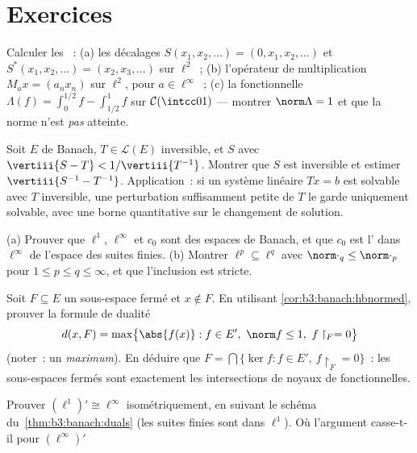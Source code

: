 \section{Exercices}

\begin{exercise}[$\star$]\label{exo:b3:banach:1}
Calculer les ~:
(a) les décalages $S(x_1, x_2, \dots) = (0, x_1, x_2, \dots)$
et $S^*(x_1, x_2, \dots) = (x_2, x_3, \dots)$ sur $\ell^2$~;
(b) l'opérateur de multiplication $M_a x = (a_nx_n)$ sur
$\ell^2$, pour $a \in \ell^\infty$~;
(c) la fonctionnelle $\Lambda(f) = \int_0^{1/2}f -
\int_{1/2}^1f$ sur $\mathcal C(\intcc01)$ --- montrer
$\norm\Lambda = 1$ et que la norme n'est \emph{pas} atteinte.
\end{exercise}

\begin{exercise}[$\star$]\label{exo:b3:banach:2}
Soit $E$ de Banach, $T \in \mathcal L(E)$ inversible, et $S$
avec $\vertiii{S - T} < 1/\vertiii{T^{-1}}$. Montrer que $S$
est inversible et estimer $\vertiii{S^{-1} - T^{-1}}$.
Application~: si un système linéaire $Tx = b$ est solvable
avec $T$ inversible, une perturbation suffisamment petite de
$T$ le garde uniquement solvable, avec une borne quantitative
sur le changement de solution.
\end{exercise}

\begin{exercise}[$\star\star$]\label{exo:b3:banach:3}
(a) Prouver que $\ell^1$, $\ell^\infty$ et $c_0$ sont des
espaces de Banach, et que $c_0$ est l' dans
$\ell^\infty$ de l'espace des suites finies.
(b) Montrer $\ell^p \subseteq \ell^q$ avec $\norm\cdot_q \leq
\norm\cdot_p$ pour $1 \leq p \leq q \leq \infty$, et que
l'inclusion est stricte.
\end{exercise}

\begin{exercise}[$\star\star$]\label{exo:b3:banach:4}
Soit $F \subseteq E$ un sous-espace fermé et $x \notin F$. En
utilisant \cref{cor:b3:banach:hbnormed}, prouver la formule de
dualité
\[
d(x, F) = \max\bigl\{\abs{f(x)} : f \in E',\ \norm f \leq 1,\
f\restriction_F = 0\bigr\}
\]
(noter~: un \emph{maximum}). En déduire que $F =
\bigcap\{\ker f : f \in E',\ f\restriction_F = 0\}$~: les
sous-espaces fermés sont exactement les intersections de
noyaux de fonctionnelles.
\end{exercise}

\begin{exercise}[$\star\star$]\label{exo:b3:banach:5}
Prouver $(\ell^1)' \cong \ell^\infty$ isométriquement, en
suivant le schéma du~\cref{thm:b3:banach:duals} (les suites
finies sont  dans $\ell^1$).
Où l'argument casse-t-il pour $(\ell^\infty)'$~
\end{exercise}

